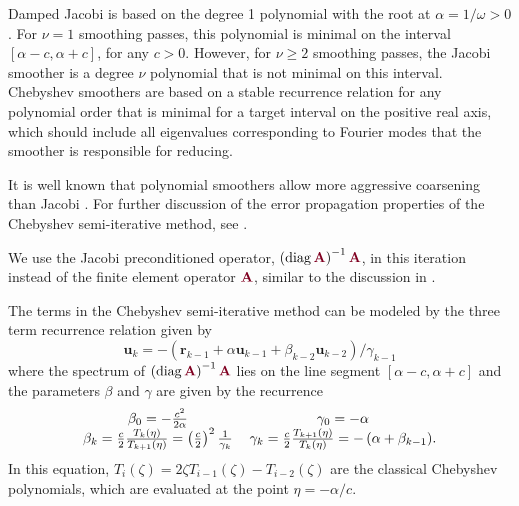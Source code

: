 Damped Jacobi is based on the degree 1 polynomial with the root at $\alpha = 1 / \omega > 0$.
For $\nu = 1$ smoothing passes, this polynomial is minimal on the interval $\left[ \alpha - c, \alpha + c \right]$, for any $c > 0$.
However, for $\nu \geq 2$ smoothing passes, the Jacobi smoother is a degree $\nu$ polynomial that is not minimal on this interval.
Chebyshev smoothers are based on a stable recurrence relation for any polynomial order that is minimal for a target interval on the positive real axis, which should include all eigenvalues corresponding to Fourier modes that the smoother is responsible for reducing.

It is well known that polynomial smoothers allow more aggressive coarsening than Jacobi \cite{brannick2015polynomial}.
For further discussion of the error propagation properties of the Chebyshev semi-iterative method, see \cite{gutknecht2002revisited}.

We use the Jacobi preconditioned operator, $\left( \diag {\color{burgundy}\mathbf{A}} \right)^{-1} {\color{burgundy}\mathbf{A}}$, in this iteration instead of the finite element operator ${\color{burgundy}\mathbf{A}}$, similar to the discussion in \cite{adams2003parallel}.

The terms in the Chebyshev semi-iterative method can be modeled by the three term recurrence relation given by
\begin{equation}
\mathbf{u}_k = - \left( \mathbf{r}_{k - 1} + \alpha \mathbf{u}_{k - 1} + \beta_{k - 2} \mathbf{u}_{k - 2} \right) / \gamma_{k - 1}
\label{eq:chebyshev_recursive}
\end{equation}
where the spectrum of $\left( \diag {\color{burgundy}\mathbf{A}} \right)^{-1} {\color{burgundy}\mathbf{A}}$ lies on the line segment $\left[ \alpha - c, \alpha + c \right]$ and the parameters $\beta$ and $\gamma$ are given by the recurrence
\begin{equation}
\begin{tabular}{c c}
$\beta_0 = - \frac{c^2}{2 \alpha}$ & $\gamma_0 = - \alpha$\\
$\beta_k = \frac{c}{2} \frac{T_k \left( \eta \right)}{T_{k + 1} \left( \eta \right)} = \left( \frac{c}{2} \right)^2 \frac{1}{\gamma_k}$ & $\gamma_k = \frac{c}{2} \frac{T_{k + 1} \left( \eta \right)}{T_k \left( \eta \right)} = - \left( \alpha + \beta_{k - 1} \right)$.
\end{tabular}
\end{equation}
In this equation, $T_i \left( \zeta \right) = 2 \zeta T_{i - 1} \left( \zeta \right) - T_{i - 2} \left( \zeta \right)$ are the classical Chebyshev polynomials, which are evaluated at the point $\eta = - \alpha / c$.

